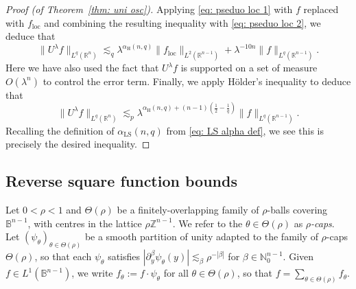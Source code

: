 \documentclass[reqno]{amsart}
\numberwithin{equation}{section}
\newcommand{\B}{\mathbb{B}}
\newcommand{\N}{\mathbb{N}}
\newcommand{\R}{\mathbb{R}}
\newcommand{\Z}{\mathbb{Z}}
\theoremstyle{plain}
\theoremstyle{definition}
\begin{document}
\begin{proof}[Proof (of Theorem~\ref{thm: uni osc})]
Applying \eqref{eq: pseduo loc 1} with $f$ replaced with $f_{\mathrm{loc}}$ and combining the resulting inequality with \eqref{eq: pseduo loc 2}, we deduce that
\begin{equation*}
    \|U^{\lambda}f\|_{L^q(\R^n)} \lesssim_q \lambda^{\alpha_{\mathrm{H}}(n,q)} \|f_{\mathrm{loc}}\|_{L^2(\R^{n-1})} + \lambda^{-10n} \|f\|_{L^q(\R^{n-1})}. 
\end{equation*}
Here we have also used the fact that $U^{\lambda}f$ is supported on a set of measure $O(\lambda^n)$ to control the error term. Finally, we apply H\"older's inequality to deduce that
\begin{equation*}
    \|U^{\lambda}f\|_{L^q(\R^n)} \lesssim_p \lambda^{\alpha_{\mathrm{H}}(n,q) + (n-1)(\frac{1}{2} - \frac{1}{q})} \|f\|_{L^q(\R^{n-1})}.
\end{equation*}
Recalling the definition of $\alpha_{\mathrm{LS}}(n,q)$ from \eqref{eq: LS alpha def}, we see this is precisely the desired inequality. 
\end{proof}





\subsection{Reverse square function bounds}

Let $0 < \rho < 1$ and $\Theta(\rho)$ be a finitely-overlapping family of $\rho$-balls covering $\B^{n-1}$, with centres in the lattice $\rho \Z^{n-1}$. We refer to the $\theta \in \Theta(\rho)$ as \textit{$\rho$-caps}. Let $(\psi_{\theta})_{\theta \in \Theta(\rho)}$ be a smooth partition of unity adapted to the family of $\rho$-caps $\Theta(\rho)$, so that each $\psi_{\theta}$ satisfies $|\partial_y^{\beta} \psi_{\theta}(y)| \lesssim_{\beta} \rho^{-|\beta|}$ for $\beta \in \N_0^{n-1}$. Given $f \in L^1(\B^{n-1})$, we write $f_{\theta} := f \cdot \psi_{\theta}$ for all $\theta \in \Theta(\rho)$, so that $f = \sum_{\theta \in \Theta(\rho)} f_{\theta}$. 
\end{document}
